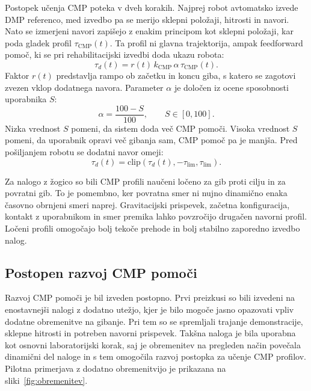 \documentclass[a4paper]{article}
\begin{document}
Postopek učenja CMP poteka v dveh korakih. Najprej robot avtomatsko izvede DMP
referenco, med izvedbo pa se merijo sklepni položaji, hitrosti in navori. Nato
se izmerjeni navori zapišejo z enakim principom kot sklepni položaji, kar poda
gladek profil $\tau_\mathrm{CMP}(t)$. Ta profil ni glavna trajektorija, ampak
feedforward pomoč, ki se pri rehabilitacijski izvedbi doda ukazu robota:
\begin{equation}
    \tau_d(t) =
    r(t)\, k_\mathrm{CMP}\,\alpha\,\tau_\mathrm{CMP}(t).
    \label{eq:tauadd}
\end{equation}
Faktor $r(t)$ predstavlja rampo ob začetku in koncu giba, s katero se zagotovi
zvezen vklop dodatnega navora. Parameter $\alpha$ je določen iz ocene sposobnosti
uporabnika $S$:
\begin{equation}
    \alpha=\frac{100-S}{100}, \qquad S\in[0,100].
    \label{eq:alpha}
\end{equation}
Nizka vrednost $S$ pomeni, da sistem doda več CMP pomoči. Visoka vrednost $S$
pomeni, da uporabnik opravi več gibanja sam, CMP pomoč pa je manjša. Pred
pošiljanjem robotu se dodatni navor omeji:
\begin{equation}
    \tau_d(t) = \mathrm{clip}\left(\tau_d(t),
    -\tau_\mathrm{lim},\tau_\mathrm{lim}\right).
    \label{eq:clip}
\end{equation}

Za nalogo z žogico so bili CMP profili naučeni ločeno za gib proti cilju in za
povratni gib. To je pomembno, ker povratna smer ni nujno dinamično enaka
časovno obrnjeni smeri naprej. Gravitacijski prispevek, začetna konfiguracija,
kontakt z uporabnikom in smer premika lahko povzročijo drugačen navorni profil.
Ločeni profili omogočajo bolj tekoče prehode in bolj stabilno zaporedno izvedbo
nalog.

\subsection{Postopen razvoj CMP pomoči}

Razvoj CMP pomoči je bil izveden postopno. Prvi preizkusi so bili izvedeni na
enostavnejši nalogi z dodatno utežjo, kjer je bilo mogoče jasno opazovati vpliv
dodatne obremenitve na gibanje. Pri tem so se spremljali trajanje demonstracije,
sklepne hitrosti in potreben navorni prispevek. Takšna naloga je bila uporabna
kot osnovni laboratorijski korak, saj je obremenitev na pregleden način povečala
dinamični del naloge in s tem omogočila razvoj postopka za učenje CMP profilov.
Pilotna primerjava z dodatno obremenitvijo je prikazana na
sliki~\ref{fig:obremenitev}.
\end{document}
